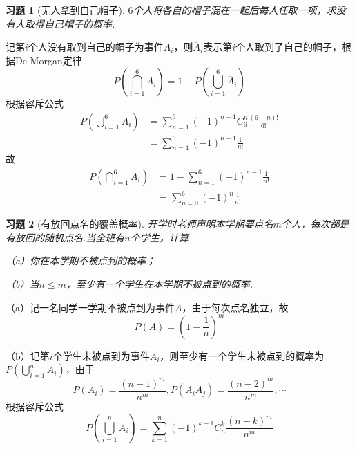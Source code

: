\documentclass[12pt,fontset=fandol]{ctexart}
\newtheorem{exercise}{习题}[section]
\begin{document}
\begin{exercise}[无人拿到自己帽子]\label{q:Y2.3}
$6$个人将各自的帽子混在一起后每人任取一项，求没有人取得自己帽子的概率.\par{}
\end{exercise}

\begin{solve}\label{a:Y2.3}
记第$i$个人没有取到自己的帽子为事件$A_i$，则$\overline{A}_i$表示第$i$个人取到了自己的帽子，根据De Morgan定律
\[P(\bigcap\limits_{i = 1}^6 {{A_i}} ) = 1 - P(\bigcup\limits_{i = 1}^6 {{{\overline A }_i}} )\]
根据容斥公式
\[\begin{aligned}P(\bigcup\limits_{i = 1}^6 {{{\overline A }_i}} ) &= \sum\limits_{n = 1}^6 {{{( - 1)}^{n - 1}}C_6^n\frac{{(6 - n)!}}{{6!}}}  \\&= \sum\limits_{n = 1}^6 {{{( - 1)}^{n - 1}}\frac{1}{{n!}}} \end{aligned}\]
故
\[\begin{aligned}P(\bigcap\limits_{i = 1}^6 {{A_i}} ) &= 1 - \sum\limits_{n = 1}^6 {{{( - 1)}^{n - 1}}\frac{1}{{n!}}}  \\&= \sum\limits_{n = 0}^6 {{{( - 1)}^n}\frac{1}{{n!}}} \end{aligned}\]
\end{solve}

\begin{exercise}[有放回点名的覆盖概率]\label{q:Y2.4}
开学时老师声明本学期要点名$m$个人，每次都是有放回的随机点名.当全班有$n$个学生，计算

（a）你在本学期不被点到的概率；

（b）当$n\leqslant m$，至少有一个学生在本学期不被点到的概率.\par{}
\end{exercise}

\begin{solve}\label{a:Y2.4}
（a）记一名同学一学期不被点到为事件$A$，由于每次点名独立，故
\[P(A) = {\left( {1 - \frac{1}{n}} \right)^m}\]

（b）记第$i$个学生未被点到为事件$A_i$，则至少有一个学生未被点到的概率为$P(\bigcup\limits_{i = 1}^n {{A_i}})$，由于\[P({A_i}) = \frac{{{{(n - 1)}^m}}}{{{n^m}}},P({A_i}{A_j}) = \frac{{{{(n - 2)}^m}}}{{{n^m}}}, \cdots \]根据容斥公式
\[P(\bigcup\limits_{i = 1}^n {{A_i}} ) = \sum\limits_{k = 1}^n {{{( - 1)}^{k - 1}}} C_n^k\frac{{{{(n - k)}^m}}}{{{n^m}}}\]
\end{solve}
\end{document}
